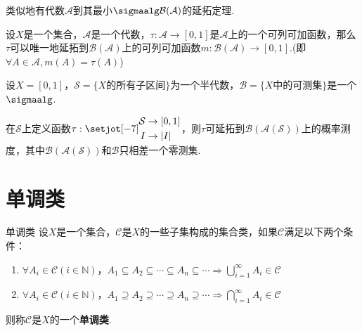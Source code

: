 类似地有代数$\mathcal{A}$到其最小$\sigmaalg\mathcal{B}(\mathcal{A})$的延拓定理.
\begin{theorem}
    设$X$是一个集合，$\mathcal{A}$是一个代数，$\tau:\mathcal{A}\to[0,1]$是$\mathcal{A}$上的一个可列可加函数，那么$\tau$可以唯一地延拓到$\mathcal{B}(\mathcal{A})$上的可列可加函数$m:\mathcal{B}(\mathcal{A})\to[0,1]$.(即$\forall A\in\mathcal{A},m(A)=\tau(A)$)
\end{theorem}
\begin{instance}
    设$X=[0,1]$，$\mathcal{S}=\{X\text{的所有子区间}\}$为一个半代数，$\mathcal{B}=\{X\text{中的可测集}\}$是一个$\sigmaalg$.\par
    在$\mathcal{S}$上定义函数$\tau:{\setjot[-7]\begin{aligned}
        \mathcal{S}&\to[0,1]\\
        I&\to|I|
    \end{aligned}}$，则$\tau$可延拓到$\mathcal{B}\left(\mathcal{A}(\mathcal{S})\right)$上的概率测度，其中$\mathcal{B}\left(\mathcal{A}(\mathcal{S})\right)$和$\mathcal{B}$只相差一个零测集.
\end{instance}

\vspace{-1 em}
\section{单调类}
\vspace{-1em}
\begin{definition}{单调类}
    设$X$是一个集合，$\mathcal{C}$是$X$的一些子集构成的集合类，如果$\mathcal{C}$满足以下两个条件：
    \begin{enumerate}
        \item $\forall A_i\in\mathcal{C}(i\in\mathbb{N})$，$A_1\subseteq A_2\subseteq \cdots\subseteq A_n\subseteq\cdots\Rightarrow \bigcup_{i=1}^\infty{A_i}\in\mathcal{C}$
        \item $\forall A_i\in\mathcal{C}(i\in\mathbb{N})$，$A_1\supseteq A_2\supseteq\cdots\supseteq A_n\supseteq\cdots\Rightarrow\bigcap_{i=1}^\infty A_i\in\mathcal{C}$
    \end{enumerate}
    则称$\mathcal{C}$是$X$的一个\textbf{单调类}.
\end{definition}

